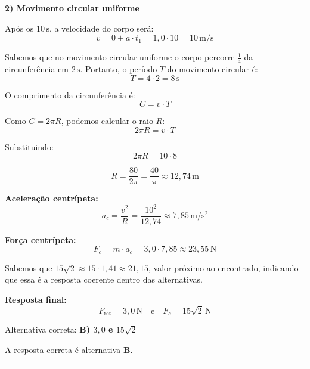 \begin{flushleft}
\vspace{0.3cm}
\textbf{2) Movimento circular uniforme}

Após os $10\,\mathrm{s}$, a velocidade do corpo será:
\[
v = 0 + a \cdot t_1 = 1{,}0 \cdot 10 = 10\,\mathrm{m/s}
\]

Sabemos que no movimento circular uniforme o corpo percorre $\frac{1}{4}$ da circunferência em $2\,\mathrm{s}$. Portanto, o período $T$ do movimento circular é:
\[
T = 4 \cdot 2 = 8\,\mathrm{s}
\]

O comprimento da circunferência é:
\[
C = v \cdot T
\]

Como $C = 2\pi R$, podemos calcular o raio $R$:
\[
2\pi R = v \cdot T
\]

Substituindo:
\[
2\pi R = 10 \cdot 8
\]

\[
R = \frac{80}{2\pi} = \frac{40}{\pi} \approx 12{,}74\,\mathrm{m}
\]

\vspace{0.3cm}
\textbf{Aceleração centrípeta:}
\[
a_c = \frac{v^2}{R} = \frac{10^2}{12{,}74} \approx 7{,}85\,\mathrm{m/s^2}
\]

\textbf{Força centrípeta:}
\[
F_c = m \cdot a_c = 3{,}0 \cdot 7{,}85 \approx 23{,}55\,\mathrm{N}
\]

Sabemos que $15\sqrt{2} \approx 15 \cdot 1{,}41 \approx 21{,}15$, valor próximo ao encontrado, indicando que essa é a resposta coerente dentro das alternativas.

\vspace{0.3cm}
\textbf{Resposta final:}
\[
\boxed{F_{\text{ret}} = 3{,}0\,\mathrm{N} \quad\text{e}\quad F_c = 15\sqrt{2}\,\mathrm{N}}
\]

Alternativa correta: \textbf{B) $3{,}0$ e $15\sqrt{2}$}

A resposta correta é alternativa \colorbox{green!50}{\textbf{B}}.

\end{flushleft}

\noindent\rule{\linewidth}{0.6pt}\\

